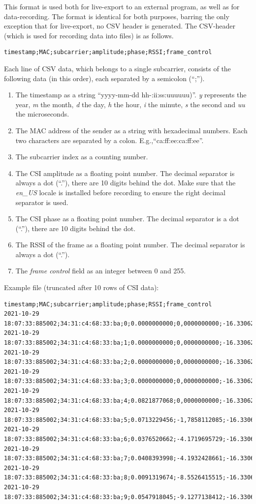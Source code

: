 \documentclass{article}
\begin{document}
This format is used both for live-export to an external program, as well as for data-recording. The format is identical for both purposes, barring the only exception that for live-export, no CSV header is generated.
The CSV-header (which is used for recording data into files) is as follows.
\begin{Verbatim}[fontsize=\small]
timestamp;MAC;subcarrier;amplitude;phase;RSSI;frame_control
\end{Verbatim}
Each line of CSV data, which belongs to a single subcarrier, consists of the following data (in this order), each separated by a semicolon (``;'').
\begin{enumerate}
	\item The timestamp as a string ``yyyy-mm-dd hh-:ii:ss:uuuuuu)''. \textit{y} represents the year, \textit{m} the month, \textit{d} the day, \textit{h} the hour, \textit{i} the minute, \textit{s} the second and \textit{uu} the microseconds.
	\item The MAC address of the sender as a string with hexadecimal numbers. Each two characters are separated by a colon. E.g.,``ca:ff:ee:ca:ff:ee''.
	\item The subcarrier index as a counting number.
	\item The CSI amplitude as a floating point number. The decimal separator is always a dot (``.''), there are 10 digits behind the dot. Make sure that the \textit{en\_US} locale is installed before recording to ensure the right decimal separator is used.
	\item The CSI phase as a floating point number. The decimal separator is a dot (``.''), there are 10 digits behind the dot.
	\item The RSSI of the frame as a floating point number. The decimal separator is always a dot (``.'').
	\item The \textit{frame control} field as an integer between 0 and 255. 
\end{enumerate}
Example file (truncated after 10 rows of CSI data):
\begin{Verbatim}[fontsize=\small]
timestamp;MAC;subcarrier;amplitude;phase;RSSI;frame_control
2021-10-29 18:07:33:885002;34:31:c4:68:33:ba;0;0.0000000000;0,0000000000;-16.3306273036;128
2021-10-29 18:07:33:885002;34:31:c4:68:33:ba;1;0.0000000000;0,0000000000;-16.3306273036;128
2021-10-29 18:07:33:885002;34:31:c4:68:33:ba;2;0.0000000000;0,0000000000;-16.3306273036;128
2021-10-29 18:07:33:885002;34:31:c4:68:33:ba;3;0.0000000000;0,0000000000;-16.3306273036;128
2021-10-29 18:07:33:885002;34:31:c4:68:33:ba;4;0.0821877068;0,0000000000;-16.3306273036;128
2021-10-29 18:07:33:885002;34:31:c4:68:33:ba;5;0.0713229456;-1,7858112085;-16.3306273036;128
2021-10-29 18:07:33:885002;34:31:c4:68:33:ba;6;0.0376520662;-4.1719695729;-16.3306273036;128
2021-10-29 18:07:33:885002;34:31:c4:68:33:ba;7;0.0408393998;-4.1932428661;-16.3306273036;128
2021-10-29 18:07:33:885002;34:31:c4:68:33:ba;8;0.0091319674;-8.5526415515;-16.3306273036;128
2021-10-29 18:07:33:885002;34:31:c4:68:33:ba;9;0.0547918045;-9.1277138412;-16.3306273036;128
\end{Verbatim}
\end{document}
